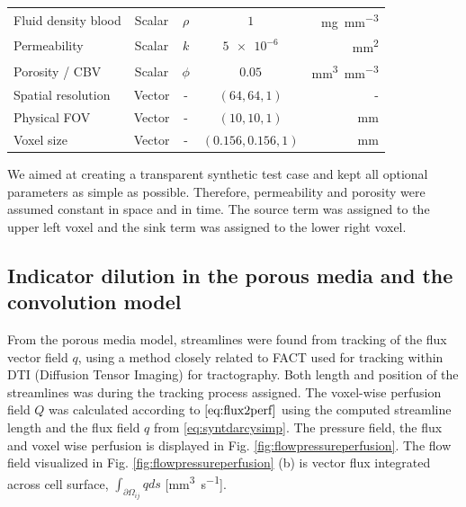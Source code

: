 \documentclass[paper=a4, fontsize=11pt,parskip=half,headings=small]{scrartcl}
\newcommand{\Perf}{Q}
\newcommand{\simu}{k\pascal$\cdot$\second}
\newcommand{\siFmm}{\milli\meter\cubed\per\second}
\begin{document}
\begin{table}[H]
\begin{tabular}{ l  c  c c  r }
			Fluid density blood \cite{kenner89} 			& Scalar & $\rho$ 			& $\num{1}$				& \si{\milli\gram\per\cubic\milli\meter} 		\\
			Permeability  							&	Scalar	& $k$ 				& $\num{5e-6}$ 			& \si{\square\milli\meter} 			\\
			Porosity / CBV	\cite{Smith00}						&	Scalar	& $\phi$ 			& $0.05$ 				& \si{\cubic\milli\meter\per\cubic\milli\meter}	\\
			Spatial resolution 						&	Vector	& - 				& $(64,64,1)$ 			& -					\\
			Physical FOV 							&	Vector & - 				& $(10,10,1)$ 			& \si{\milli\meter}				\\
			Voxel size 							&	Vector	& - 				& $(0.156,0.156,1)$ 	& \si{\milli\meter}	\\
	  \end{tabular}
	  \label{tab:par}
	\end{table}	
	
	We aimed at creating a transparent synthetic test case and kept all optional parameters as simple as possible. 
	Therefore, permeability and porosity were assumed constant in space and in time. The source term was assigned to the upper left voxel and the sink term was assigned to the lower right voxel. 
	
	\subsection{Indicator dilution in the porous media and the convolution model}


From the porous media model, streamlines were found from tracking of the flux vector field $q$, using a method closely related to FACT \cite{Mori1998} used for tracking within DTI (Diffusion Tensor Imaging) for tractography. Both length and position of the streamlines was during the tracking process assigned. The voxel-wise perfusion field $\Perf$ was calculated according to $\eqref{eq:flux2perf}$ using the computed streamline length and the flux field $q$ from \eqref{eq:syntdarcysimp}. The pressure field, the flux and voxel wise perfusion is displayed in Fig. \ref{fig:flowpressureperfusion}. The flow field visualized in  Fig. \ref{fig:flowpressureperfusion} (b) is vector flux integrated across cell surface, $\int_{\partial \Omega_{ij}}q ds$ [\si{\siFmm}].
\end{document}
